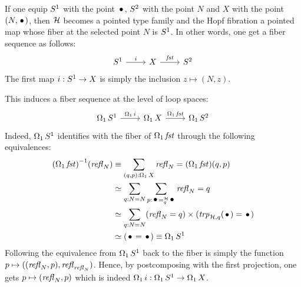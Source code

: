 \documentclass[english,a4]{article}
\begin{document}
If one equip ${S^1}$ with the point $\base$, $S^2$ with the point $N$
and $X$ with the point $(N,\base)$, then $\mathcal H$ becomes a pointed
type family and the Hopf fibration a pointed map whose fiber at the
selected point $N$ is ${S^1}$. In other words, one get a fiber sequence
as follows:
\begin{equation}
  \label{eq:9}
  \begin{tikzcd}
    \Sc \rar["i"] & X \rar["\fst"] & \Sp
  \end{tikzcd}
\end{equation}
The first map $i:{S^1} \to X$ is simply the inclusion $z\mapsto
(N,z)$.

This induces a fiber sequence at the level of loop spaces:
\begin{equation}
  \label{eq:12}
  \begin{tikzcd}
    \loopspace 1 \Sc \rar["\loopspace 1 i"] & \loopspace 1 X \rar["\loopspace 1 \fst"] & \loopspace 1 \Sp
  \end{tikzcd}
\end{equation}
Indeed, $\operatorname{\Omega_{1}} {S^1}$ identifies with the fiber of
$\operatorname{\Omega_{1}} \mathop{\mathit{fst}}$ through the following equivalences:
\begin{align}
  \inv {(\loopspace 1 \fst)} {(\refl N)}
  &\jdeq \sum_{(q,p):\loopspace 1 X}\refl N = (\loopspace 1 \fst)(q,p)
  \\
  &\weq \sum_{q:N=N}\sum_{p:\pathover \base {\hopffam} q \base}\refl N = q
  \\
  &\weq \sum_{q:N=N}(\refl N = q)\times(\trp{\hopffam, q}(\base) =\base)
  \\
  &\weq (\base = \base) \jdeq \loopspace 1 \Sc
\end{align}
Following the equivalence from $\operatorname{\Omega_{1}} {S^1}$ back to the fiber is
simply the function $p \mapsto ((\mathop{{\mathit{refl}}_{N}},p),\mathop{{\mathit{refl}}_{\mathop{{\mathit{refl}}_{N}}}})$. Hence,
by postcomposing with the first projection, one gets
$p \mapsto (\mathop{{\mathit{refl}}_{N}}, p)$ which is indeed
$\operatorname{\Omega_{1}} i: \operatorname{\Omega_{1}} {S^1} \to \operatorname{\Omega_{1}} X$.
\end{document}
